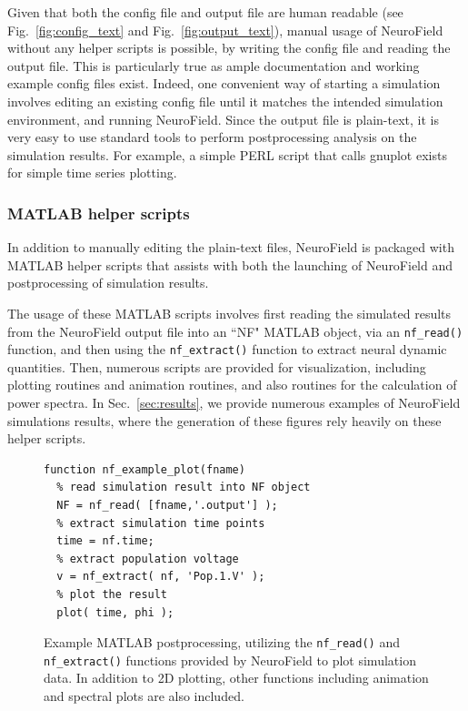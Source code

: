 \documentclass[preprint,review,10pt,authoryear,letterpaper]{elsarticle}
\begin{document}
Given that both the config file and output file are human readable (see Fig.~\ref{fig:config_text} and Fig.~\ref{fig:output_text}), manual usage of NeuroField without any helper scripts is possible, by writing the config file and reading the output file. This is particularly true as ample documentation and working example config files exist. Indeed, one convenient way of starting a simulation involves editing an existing config file until it matches the intended simulation environment, and running NeuroField. Since the output file is plain-text, it is very easy to use standard tools to perform postprocessing analysis on the simulation results. For example, a simple PERL script that calls gnuplot exists for simple time series plotting.

\subsubsection{MATLAB helper scripts}
\label{sec:postprocess-matlab}

In addition to manually editing the plain-text files, NeuroField is packaged with MATLAB helper scripts that assists with both the launching of NeuroField and postprocessing of simulation results.

The usage of these MATLAB scripts involves first reading the simulated results from the NeuroField output file into an ``NF" MATLAB object, via an {\tt nf\_read()} function, and then using the {\tt nf\_extract()} function to extract neural dynamic quantities. Then, numerous scripts are provided for visualization, including plotting routines and animation routines, and also routines for the calculation of power spectra. In Sec.~\ref{sec:results}, we provide numerous examples of NeuroField simulations results, where the generation of these figures rely heavily on these helper scripts.


\begin{figure}[th]
\begin{center}
\begin{lstlisting}
function nf_example_plot(fname)
  % read simulation result into NF object
  NF = nf_read( [fname,'.output'] );
  % extract simulation time points
  time = nf.time;
  % extract population voltage
  v = nf_extract( nf, 'Pop.1.V' );
  % plot the result
  plot( time, phi );
\end{lstlisting}
\caption{Example MATLAB postprocessing, utilizing the {\tt nf\_read()} and {\tt nf\_extract()} functions provided by NeuroField to plot simulation data. In addition to 2D plotting, other functions including animation and spectral plots are also included.}
\label{fig:matlab_eg}
\end{center}
\end{figure}
\end{document}
